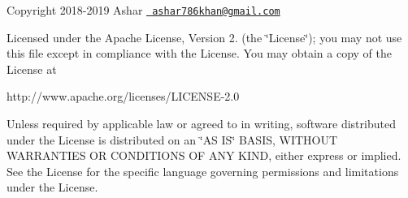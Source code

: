 Copyright 2018-\/2019 Ashar 
\href{mailto:ashar786khan@gmail.com}{\texttt{ ashar786khan@gmail.\+com}}

Licensed under the Apache License, Version 2. (the \char`\"{}\+License\char`\"{}); you may not use this file except in compliance with the License. You may obtain a copy of the License at \begin{DoxyVerb}http://www.apache.org/licenses/LICENSE-2.0
\end{DoxyVerb}


Unless required by applicable law or agreed to in writing, software distributed under the License is distributed on an \char`\"{}\+A\+S I\+S\char`\"{} B\+A\+S\+IS, W\+I\+T\+H\+O\+UT W\+A\+R\+R\+A\+N\+T\+I\+ES OR C\+O\+N\+D\+I\+T\+I\+O\+NS OF A\+NY K\+I\+ND, either express or implied. See the License for the specific language governing permissions and limitations under the License.